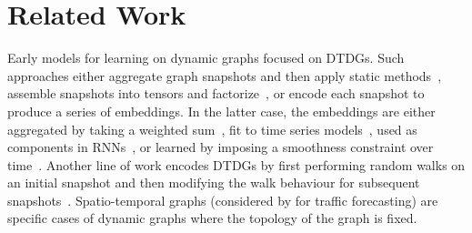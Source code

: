 \documentclass{article}
\begin{document}
\section{Related Work}







Early models for learning on dynamic graphs focused on DTDGs. Such approaches either aggregate graph snapshots and then apply static methods~\citep{10.5555/1241540.1241551, Hisano_2018, sharan2008temporal, ibrahim2015link, ahmed2016efficient, ahmed2016sampling}, assemble snapshots into tensors and factorize~\citep{dunlavy2011temporal, yu2017link, ma2019embedding}, or encode each snapshot to produce a series of embeddings. In the latter case, the embeddings are either aggregated by taking a weighted sum~\citep{yao2016link, zhu2012hybrid}, fit to time series models~\citep{huang2009time, gunecs2016link, da2012time, moradabadi2017novel}, used as components in RNNs~\citep{Seo_2018, NARAYAN2018433, MANESSI2020107000, yu20193d, chen2018gclstm, sankar2020dysat, pareja2019evolvegcn}, or learned by imposing a smoothness constraint over time~\citep{kim2009particle, gupta2011evolutionary, yao2016link, zhu2017next, zhou2018dynamic, ijcai2019-640, journals/corr/abs-1805-11273, fard2019relationship, pei2016node}. Another line of work encodes DTDGs by first performing random walks on an initial snapshot and then modifying the walk behaviour for subsequent snapshots~\citep{mahdavi2018dynnode2vec,du2018dynamic, xin2016adaptive, 8508272, yu2018netwalk}. 
%
Spatio-temporal graphs (considered by \cite{zhang2018gaan, li2018diffusion} for traffic forecasting) are specific cases of dynamic graphs where the topology of the graph is fixed. 
\end{document}
